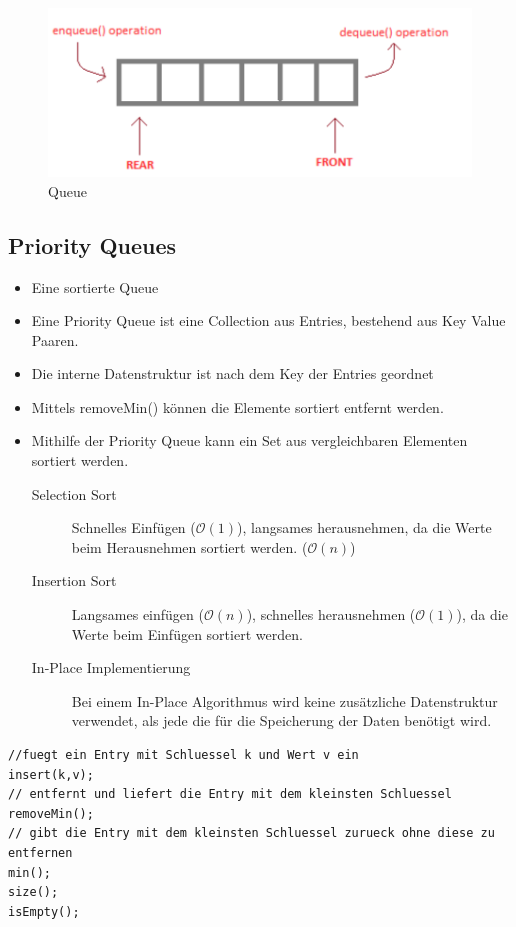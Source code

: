 \begin{figure}[h]
	\centering
	\includegraphics[width=0.7\linewidth]{images/queue.pdf}
	\caption{Queue}
\end{figure}

\subsection{Priority Queues}
\begin{itemize}
	\item Eine sortierte Queue
	\item Eine Priority Queue ist eine Collection aus Entries, bestehend aus Key Value Paaren.
	\item Die interne Datenstruktur ist nach dem Key der Entries geordnet
	\item Mittels removeMin() können die Elemente sortiert entfernt werden.
	\item Mithilfe der Priority Queue kann ein Set aus vergleichbaren Elementen sortiert werden.
	\begin{description}
		\item[Selection Sort] Schnelles Einfügen ($\mathcal{O}(1)$), langsames herausnehmen, da die Werte beim Herausnehmen sortiert werden. ($\mathcal{O}(n)$)
		\item[Insertion Sort] Langsames einfügen ($\mathcal{O}(n)$), schnelles herausnehmen ($\mathcal{O}(1)$), da die Werte beim Einfügen sortiert werden.
		\item[In-Place Implementierung] Bei einem In-Place Algorithmus wird keine zusätzliche Datenstruktur verwendet, als jede die für die Speicherung der Daten benötigt wird. 
	\end{description}
\end{itemize}

\begin{lstlisting}
//fuegt ein Entry mit Schluessel k und Wert v ein
insert(k,v);
// entfernt und liefert die Entry mit dem kleinsten Schluessel
removeMin();
// gibt die Entry mit dem kleinsten Schluessel zurueck ohne diese zu entfernen
min();
size();
isEmpty();
\end{lstlisting}

